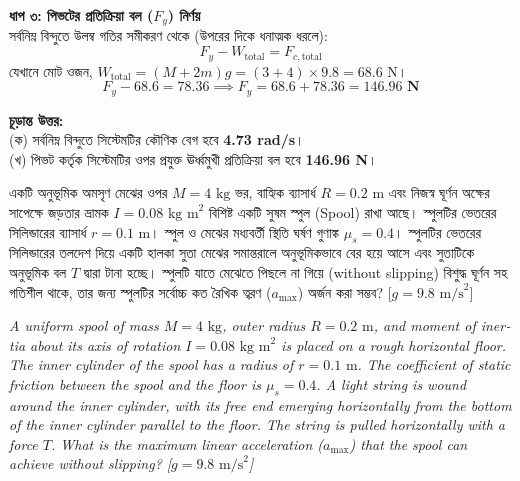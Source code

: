 \documentclass[12pt, a4paper]{article}
\begin{document}
\begin{tcolorbox}[solutionbox={সমাধান (Solution)}]
\vspace{0.5em}
\noindent
\textbf{ধাপ ৩: পিভটের প্রতিক্রিয়া বল ($F_y$) নির্ণয়} \\
সর্বনিম্ন বিন্দুতে উলম্ব গতির সমীকরণ থেকে (উপরের দিকে ধনাত্মক ধরলে):
\[ F_y - W_{\text{total}} = F_{c,\text{total}} \]
যেখানে মোট ওজন, $W_{\text{total}} = (M + 2m)g = (3 + 4) \times 9.8 = 68.6\text{ N}$।
\[ F_y - 68.6 = 78.36 \implies F_y = 68.6 + 78.36 = \mathbf{146.96\text{ N}} \]

\vspace{1em}
\begin{tcolorbox}[answerbox]
\textbf{চূড়ান্ত উত্তর:} \\
(ক) সর্বনিম্ন বিন্দুতে সিস্টেমটির কৌণিক বেগ হবে \textbf{4.73 rad/s}। \\
(খ) পিভট কর্তৃক সিস্টেমটির ওপর প্রযুক্ত ঊর্ধ্বমুখী প্রতিক্রিয়া বল হবে \textbf{146.96 N}।
\end{tcolorbox}
\end{tcolorbox}


\begin{tcolorbox}[questionbox={প্রশ্ন (Question) 6}]
\noindent
একটি অনুভূমিক অমসৃণ মেঝের ওপর $M = 4\text{ kg}$ ভর, বাহ্যিক ব্যাসার্ধ $R = 0.2\text{ m}$ এবং নিজস্ব ঘূর্ণন অক্ষের সাপেক্ষে জড়তার ভ্রামক $I = 0.08\text{ kg m}^2$ বিশিষ্ট একটি সুষম স্পুল (Spool) রাখা আছে। স্পুলটির ভেতরের সিলিন্ডারের ব্যাসার্ধ $r = 0.1\text{ m}$। স্পুল ও মেঝের মধ্যবর্তী স্থিতি ঘর্ষণ গুণাঙ্ক $\mu_s = 0.4$। স্পুলটির ভেতরের সিলিন্ডারের তলদেশ দিয়ে একটি হালকা সুতা মেঝের সমান্তরালে অনুভূমিকভাবে বের হয়ে আসে এবং সুতাটিকে অনুভূমিক বল $T$ দ্বারা টানা হচ্ছে। স্পুলটি যাতে মেঝেতে পিছলে না গিয়ে (without slipping) বিশুদ্ধ ঘূর্ণন সহ গতিশীল থাকে, তার জন্য স্পুলটির সর্বোচ্চ কত রৈখিক ত্বরণ ($a_{\text{max}}$) অর্জন করা সম্ভব? [$g = 9.8\text{ m/s}^2$]

\vspace{0.8em}
\begin{english}
\noindent\textit{\color{darkgray}
A uniform spool of mass $M = 4\text{ kg}$, outer radius $R = 0.2\text{ m}$, and moment of inertia about its axis of rotation $I = 0.08\text{ kg m}^2$ is placed on a rough horizontal floor. The inner cylinder of the spool has a radius of $r = 0.1\text{ m}$. The coefficient of static friction between the spool and the floor is $\mu_s = 0.4$. A light string is wound around the inner cylinder, with its free end emerging horizontally from the bottom of the inner cylinder parallel to the floor. The string is pulled horizontally with a force $T$. What is the maximum linear acceleration ($a_{\text{max}}$) that the spool can achieve without slipping? [$g = 9.8\text{ m/s}^2$]
}
\end{english}
\end{tcolorbox}
\end{document}
